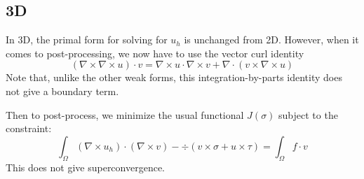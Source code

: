 \documentclass{article}
\begin{document}
\subsection{3D}
In 3D, the primal form for solving for $u_h$ is unchanged from 
2D. However, when it comes to post-processing, we now have to use 
the vector curl identity $$(\nabla\times\nabla\times u)\cdot v=
\nabla\times u\cdot\nabla\times v + \nabla\cdot(v\times\nabla\times u)$$
Note that, unlike the other weak forms, this integration-by-parts 
identity does not give a boundary term. 

Then to post-process, we minimize the usual functional $J(\sigma)$ 
subject to the constraint: 
$$\int_\Omega(\nabla\times u_h)\cdot(\nabla\times v)-
\div(v\times\sigma + u\times\tau)=\int_\Omega f\cdot v$$
This does not give superconvergence. 

\printbibliography
\end{document}
